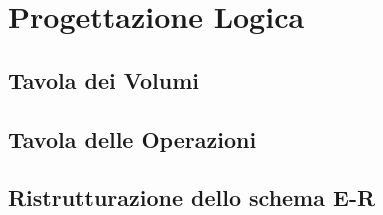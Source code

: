 \documentclass[letterpaper]{report}
\begin{document}
\chapter{Progettazione Logica}
\section{Tavola dei Volumi}



\section{Tavola delle Operazioni}



\section{Ristrutturazione dello schema E-R}


\end{document}
